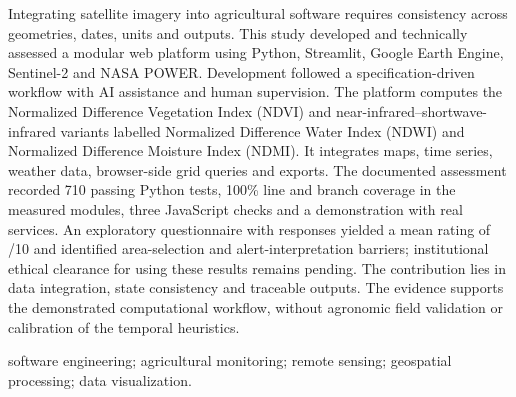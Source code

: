 \begin{Abstract}
Integrating satellite imagery into agricultural software requires consistency across geometries, dates, units and outputs. This study developed and technically assessed a modular web platform using Python, Streamlit, Google Earth Engine, Sentinel-2 and NASA POWER. Development followed a specification-driven workflow with AI assistance and human supervision. The platform computes the Normalized Difference Vegetation Index (NDVI) and near-infrared--shortwave-infrared variants labelled Normalized Difference Water Index (NDWI) and Normalized Difference Moisture Index (NDMI). It integrates maps, time series, weather data, browser-side grid queries and exports. The documented assessment recorded 710 passing Python tests, 100\% line and branch coverage in the measured modules, three JavaScript checks and a demonstration with real services. An exploratory questionnaire with \UsuariosN{} responses yielded a mean rating of \UsuariosMediaEN{}/10 and identified area-selection and alert-interpretation barriers; institutional ethical clearance for using these results remains pending. The contribution lies in data integration, state consistency and traceable outputs. The evidence supports the demonstrated computational workflow, without agronomic field validation or calibration of the temporal heuristics.
\end{Abstract}
\begin{keywords}
software engineering; agricultural monitoring; remote sensing; geospatial processing; data visualization.
\end{keywords}

